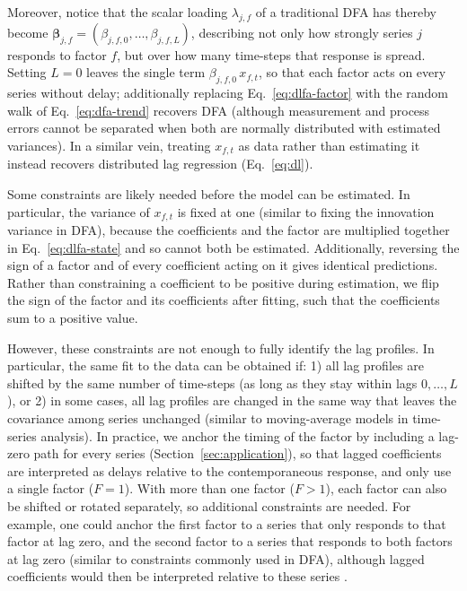 \documentclass[12pt]{article}
\begin{document}
Moreover, notice that the scalar loading $\lambda_{j,f}$ of a
traditional DFA has thereby become $\boldsymbol\beta_{j,f} =
(\beta_{j,f,0},\dots,\beta_{j,f,L})$, describing not only how strongly
series $j$ responds to factor $f$, but over how many time-steps that
response is spread. Setting $L = 0$ leaves the single term
$\beta_{j,f,0}\,x_{f,t}$, so that each factor acts on every series
without delay; additionally replacing Eq.~\ref{eq:dlfa-factor} with the
random walk of Eq.~\ref{eq:dfa-trend} recovers DFA (although
measurement and process errors cannot be separated when both are
normally distributed with estimated variances). In a similar vein,
treating $x_{f,t}$ as data rather than estimating it instead recovers
distributed lag regression (Eq.~\ref{eq:dl}).

Some constraints are likely needed before the model can be estimated. In
particular, the variance of $x_{f,t}$ is fixed at one (similar to
fixing the innovation variance in DFA), because the coefficients and the
factor are multiplied together in Eq.~\ref{eq:dlfa-state} and so cannot
both be estimated. Additionally, reversing the sign of a factor and of
every coefficient acting on it gives identical predictions. Rather than
constraining a coefficient to be positive during estimation, we flip the
sign of the factor and its coefficients after fitting, such that the
coefficients sum to a positive value.

However, these constraints are not enough to fully identify the lag
profiles. In particular, the same fit to the data can be obtained if: 1)
all lag profiles are shifted by the same number of time-steps (as
long as they stay within lags $0,\dots,L$), or 2) in some cases, all
lag profiles are changed in the same way that leaves the covariance
among series unchanged (similar to moving-average models in time-series
analysis). In practice, we anchor the timing of the factor by including
a lag-zero path for every series (Section~\ref{sec:application}), so
that lagged coefficients are interpreted as delays relative to the
contemporaneous response, and only use a single factor ($F = 1$). With
more than one factor ($F > 1$), each factor can also be shifted or
rotated separately, so additional constraints are needed. For example,
one could anchor the first factor to a series that only responds to
that factor at lag zero, and the second factor to a series that responds
to both factors at lag zero (similar to constraints commonly used in
DFA), although lagged coefficients would then be interpreted relative to
these series \citep[see also][]{forni_generalized_2000,
stock_dynamic_2016}.
\end{document}
